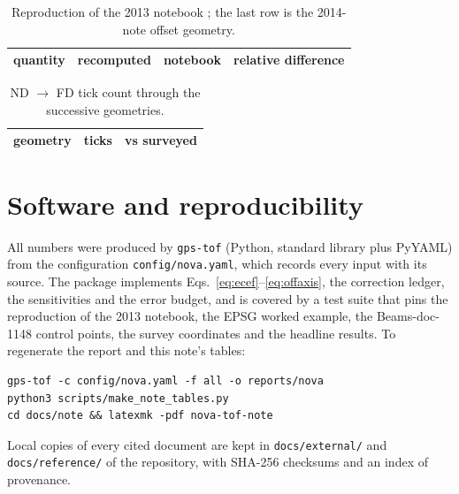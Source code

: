 \documentclass[11pt,letterpaper]{article}
\newcommand{\ND}{ND}
\newcommand{\FD}{FD}
\newcommand{\code}[1]{\texttt{#1}}
\begin{document}
\begin{table}[htbp]\centering\small
\caption{Reproduction of the 2013 notebook \cite{norman2013nb}; the last row is the 2014-note offset geometry.}
\label{tab:repro}
\begin{tabular}{lrrr}
\toprule
quantity & recomputed & notebook & relative difference \\
\midrule

\end{tabular}
\end{table}
\begin{table}[htbp]\centering\scriptsize
\caption{Correction ledger of the superseded 2014-note geometry (antenna fixes with vertical offsets).}
\label{tab:ledger2014}
\end{table}
\begin{table}[htbp]\centering\small
\caption{\ND{} $\to$ \FD{} tick count through the successive geometries.}
\label{tab:history}
\begin{tabular}{lrr}
\toprule
geometry & ticks & vs surveyed \\
\midrule

\end{tabular}
\end{table}

\section{Software and reproducibility}
All numbers were produced by \code{gps-tof} \cite{gpstof} (Python, standard library plus PyYAML) from the configuration \code{config/nova.yaml}, which records every input with its source.  The package implements Eqs.~\eqref{eq:ecef}--\eqref{eq:offaxis}, the correction ledger, the sensitivities and the error budget, and is covered by a test suite that pins the reproduction of the 2013 notebook, the EPSG worked example, the Beams-doc-1148 control points, the survey coordinates and the headline results.  To regenerate the report and this note's tables:
\begin{verbatim}
gps-tof -c config/nova.yaml -f all -o reports/nova
python3 scripts/make_note_tables.py
cd docs/note && latexmk -pdf nova-tof-note
\end{verbatim}
Local copies of every cited document are kept in \code{docs/external/} and \code{docs/reference/} of the repository, with SHA-256 checksums and an index of provenance.



\end{document}
